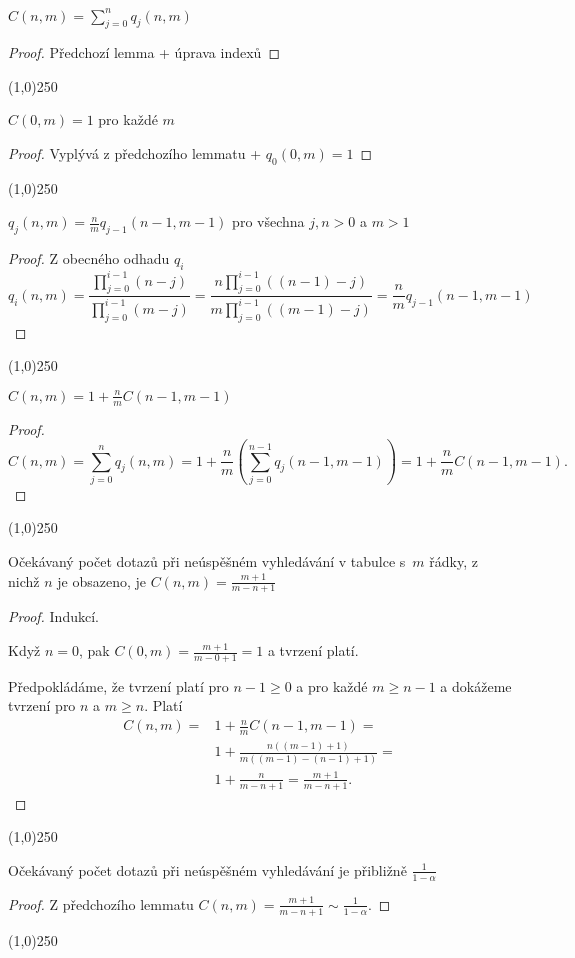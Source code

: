 \documentclass[a4paper,12pt]{article}
\newenvironment{myproof}{
  \begin{proof}
    
  }{
  \end{proof}
  \begin{center}
   \line(1,0){250}
   \end{center}
  }
\begin{document}
\begin{lemma}
    $C(n,m)=\sum_{j=0}^{n}q_j(n,m)$
\end{lemma}
\begin{myproof}
    Předchozí lemma + úprava indexů
\end{myproof}

\begin{lemma}
    $C(0,m)=1$ pro každé $m$
\end{lemma}
\begin{myproof}
     Vyplývá z předchozího lemmatu + $q_0(0,m)=1$
\end{myproof}   

\begin{lemma}
    $q_j(n,m)=\frac nmq_{j-1}(n-1,m-1)$ pro všechna $j,n>0$ a $m>1$
\end{lemma}
\begin{myproof}
     Z obecného odhadu $q_i$ $$q_i(n,m)=\frac {\prod_{j=0}^{i-1}(n-j)}{\prod_{j=0}^{i-1}(m-j)} = \frac {n\prod_{j=0}^{i-1}((n-1)-j)}{m\prod_{j=0}^{i-1}((m-1)-j)}=\frac nmq_{j-1}(n-1,m-1)$$
\end{myproof}

\begin{lemma}
    $C(n,m)=1+\frac nmC(n-1,m-1)$
\end{lemma}
\begin{myproof}
    $$C(n,m)=\sum_{j=0}^nq_j(n,m)=1+\frac nm(\sum_{j=0}^{n-1}q_j(n-1,
    m-1))=1+\frac nmC(n-1,m-1).$$
\end{myproof}

\begin{lemma}
    Očekávaný počet dotazů při neúspěšném 
    vyhledávání v tabulce s~$m$ řádky, z nichž $n$ je obsazeno, je $C(n,m)=\frac {m+1}{m-n
    +1}$
\end{lemma}
\begin{myproof}
Indukcí. 

Když $n=0$, pak 
$C(0,m)=\frac {m+1}{m-0+1}=1$ a tvrzení platí.

Předpokládáme, že tvrzení 
platí pro $n-1\ge 0$ a pro každé $m\ge n-1$ a dokážeme tvrzení 
pro $n$ a $m\ge n$. Platí
\begin{align*} C(n,m)=&1+\frac nmC(n-1,m-1)=\\
&1+\frac {n((m-1)+1)}{m((m-1)-(n-1)+1)}=\\
&1+\frac n{m-n+1}=\frac {m+1}{m-n+1}.\end{align*}
\end{myproof}

\begin{veta}
    Očekávaný počet dotazů při neúspěšném 
    vyhledávání je přibližně $\frac 1{1-\alpha}$
\end{veta}
\begin{myproof}
    Z předchozího lemmatu $C(n,m) = \frac {m+1}{m-n+1} \sim \frac 1{1-\alpha}$.
\end{myproof}
\end{document}
